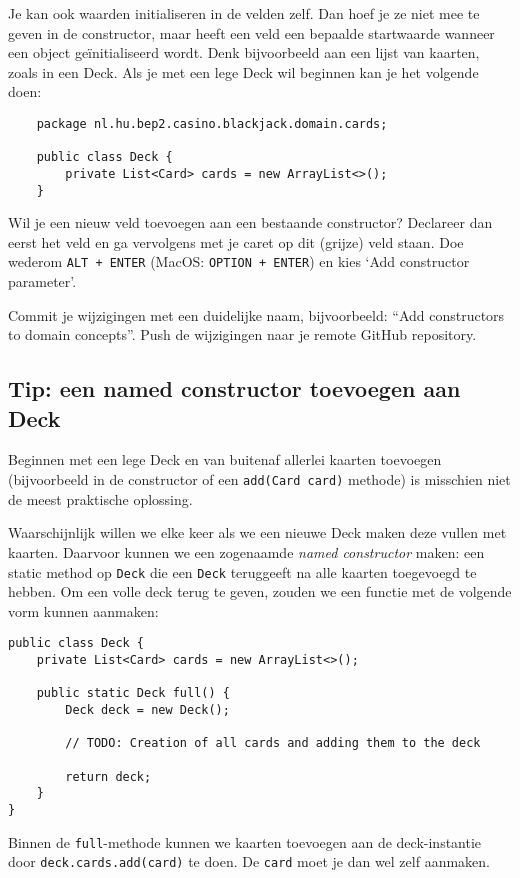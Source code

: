 Je kan ook waarden initialiseren in de velden zelf. Dan hoef je ze niet mee te geven 
in de constructor, maar heeft een veld een bepaalde startwaarde wanneer een object 
geïnitialiseerd wordt. Denk bijvoorbeeld aan een lijst van kaarten, zoals in een Deck.
Als je met een lege Deck wil beginnen kan je het volgende doen:

\begin{verbatim}
    package nl.hu.bep2.casino.blackjack.domain.cards;

    public class Deck {
        private List<Card> cards = new ArrayList<>();
    }
\end{verbatim}

Wil je een nieuw veld toevoegen aan een bestaande constructor? Declareer dan eerst het veld
en ga vervolgens met je caret op dit (grijze) veld staan. 
Doe wederom \texttt{ALT + ENTER} (MacOS: \texttt{OPTION + ENTER})
en kies `Add constructor parameter'.

Commit je wijzigingen met een duidelijke naam, 
bijvoorbeeld: ``Add constructors to domain concepts''. 
Push de wijzigingen naar je remote GitHub repository.

\subsection{Tip: een named constructor toevoegen aan Deck}
Beginnen met een lege Deck en van buitenaf allerlei kaarten toevoegen 
(bijvoorbeeld in de constructor of een \texttt{add(Card card)} methode)
is misschien niet de meest praktische oplossing.

Waarschijnlijk willen we elke keer als we een nieuwe Deck maken
deze vullen met kaarten. Daarvoor kunnen we een zogenaamde \textit{named constructor}
maken: een static method op \texttt{Deck} die een \texttt{Deck} teruggeeft 
na alle kaarten toegevoegd te hebben. Om een volle deck terug te geven, zouden 
we een functie met de volgende vorm kunnen aanmaken:

\begin{verbatim}
public class Deck {
    private List<Card> cards = new ArrayList<>();

    public static Deck full() {
        Deck deck = new Deck();

        // TODO: Creation of all cards and adding them to the deck

        return deck;
    }
}
\end{verbatim}

Binnen de \texttt{full}-methode kunnen we kaarten toevoegen aan de 
deck-instantie door \texttt{deck.cards.add(card)} te doen. De \texttt{card}
moet je dan wel zelf aanmaken.

